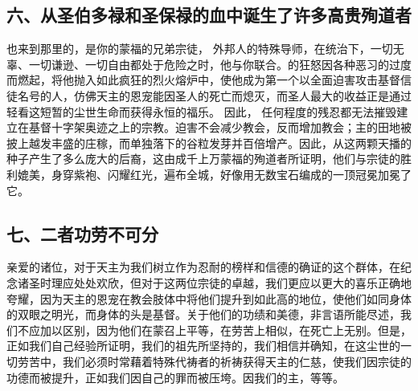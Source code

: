 
\subsection{六、从圣伯多禄和圣保禄的血中诞生了许多高贵殉道者}

也来到那里的，是你的蒙福的兄弟宗徒， 外邦人的特殊导师，在统治下，一切无辜、一切谦逊、一切自由都处于危险之时，他与你联合。的狂怒因各种恶习的过度而燃起，将他抛入如此疯狂的烈火熔炉中，使他成为第一个以全面迫害攻击基督信徒名号的人，仿佛天主的恩宠能因圣人的死亡而熄灭，而圣人最大的收益正是通过轻看这短暂的尘世生命而获得永恒的福乐。 因此， 任何程度的残忍都无法摧毁建立在基督十字架奥迹之上的宗教。迫害不会减少教会，反而增加教会；主的田地被披上越发丰盛的庄稼，而单独落下的谷粒发芽并百倍增产。因此，从这两颗天播的种子产生了多么庞大的后裔，这由成千上万蒙福的殉道者所证明，他们与宗徒的胜利媲美，身穿紫袍、闪耀红光，遍布全城，好像用无数宝石编成的一顶冠冕加冕了它。\par


\subsection{七、二者功劳不可分}

亲爱的诸位，对于天主为我们树立作为忍耐的榜样和信德的确证的这个群体，在纪念诸圣时理应处处欢欣，但对于这两位宗徒的卓越，我们更应以更大的喜乐正确地夸耀，因为天主的恩宠在教会肢体中将他们提升到如此高的地位，使他们如同身体的双眼之明光，而身体的头是基督。关于他们的功绩和美德，非言语所能尽述，我们不应加以区别，因为他们在蒙召上平等，在劳苦上相似，在死亡上无别。但是，正如我们自己经验所证明，我们的祖先所坚持的，我们相信并确知，在这尘世的一切劳苦中，我们必须时常藉着特殊代祷者的祈祷获得天主的仁慈，使我们因宗徒的功德而被提升，正如我们因自己的罪而被压垮。因我们的主，等等。\par



